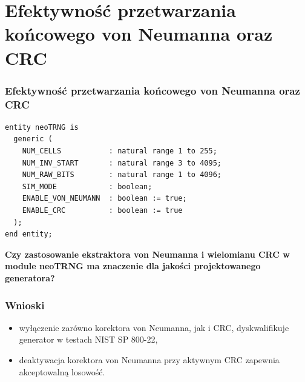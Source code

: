 \documentclass{beamer}
\begin{document}
\section{Efektywność przetwarzania końcowego von Neumanna oraz CRC}
\begin{frame}[fragile]
\frametitle{Efektywność przetwarzania końcowego von Neumanna oraz CRC}

\begin{verbatim}
entity neoTRNG is
  generic (
    NUM_CELLS           : natural range 1 to 255;
    NUM_INV_START       : natural range 3 to 4095;
    NUM_RAW_BITS        : natural range 1 to 4096;
    SIM_MODE            : boolean;
    ENABLE_VON_NEUMANN  : boolean := true;
    ENABLE_CRC          : boolean := true
  );
end entity;
\end{verbatim}



    \textbf{Czy zastosowanie ekstraktora von Neumanna i wielomianu CRC w module neoTRNG ma znaczenie
dla jakości projektowanego generatora?}

\end{frame}
\begin{frame}
\frametitle{Wnioski}

\Large

\begin{itemize}
    \item wyłączenie zarówno korektora von Neumanna, jak i CRC, dyskwalifikuje generator w testach NIST SP 800-22,
    \item deaktywacja korektora von Neumanna przy aktywnym CRC zapewnia akceptowalną losowość.
\end{itemize}

\end{frame}












\end{document}

